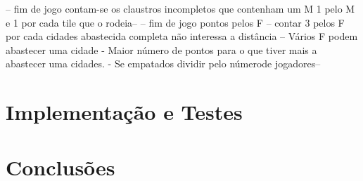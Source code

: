   {-- fim de jogo contam-se os claustros incompletos que contenham um M
    	1 pelo M e 1 por cada tile que o rodeia--}
  {-- fim de jogo pontos pelos F
    	-- contar 3 pelos F por cada cidades abastecida completa não interessa a distância
    	-- Vários F podem abastecer uma cidade 
		- Maior número de pontos para o que tiver mais a abastecer uma cidades.
		- Se empatados dividir pelo númerode jogadores--}





\section{Implementação e Testes}




\section{Conclusões}





